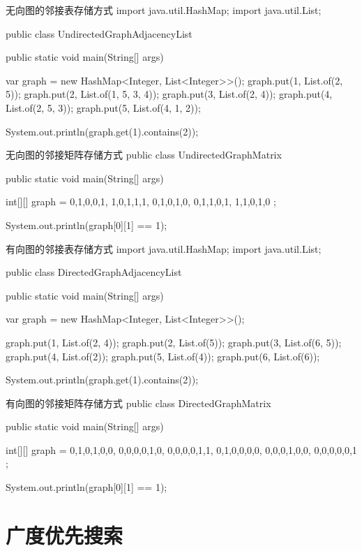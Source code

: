 \documentclass[oneside,10pt,fontset=none]{ctexbook}
\numberwithin{definition}{chapter}
\numberwithin{theorem}{chapter}
\numberwithin{lemma}{chapter}
\begin{document}
\begin{myjava}{}{无向图的邻接表存储方式}{}
import java.util.HashMap;
import java.util.List;

public class UndirectedGraphAdjacencyList {
    public static void main(String[] args) {
        var graph = new HashMap<Integer, List<Integer>>();
        graph.put(1, List.of(2, 5));
        graph.put(2, List.of(1, 5, 3, 4));
        graph.put(3, List.of(2, 4));
        graph.put(4, List.of(2, 5, 3));
        graph.put(5, List.of(4, 1, 2));

        System.out.println(graph.get(1).contains(2));
    }
}
\end{myjava}

\begin{myjava}{}{无向图的邻接矩阵存储方式}{}
public class UndirectedGraphMatrix {
    public static void main(String[] args) {
        int[][] graph = {
                {0,1,0,0,1},
                {1,0,1,1,1},
                {0,1,0,1,0},
                {0,1,1,0,1},
                {1,1,0,1,0}
        };

        System.out.println(graph[0][1] == 1);
    }
}
\end{myjava}

\begin{myjava}{}{有向图的邻接表存储方式}{}
import java.util.HashMap;
import java.util.List;

public class DirectedGraphAdjacencyList {
    public static void main(String[] args) {
        var graph = new HashMap<Integer, List<Integer>>();

        graph.put(1, List.of(2, 4));
        graph.put(2, List.of(5));
        graph.put(3, List.of(6, 5));
        graph.put(4, List.of(2));
        graph.put(5, List.of(4));
        graph.put(6, List.of(6));

        System.out.println(graph.get(1).contains(2));
    }
}
\end{myjava}

\begin{myjava}{}{有向图的邻接矩阵存储方式}{}
public class DirectedGraphMatrix {
    public static void main(String[] args) {
        int[][] graph = {
                {0,1,0,1,0,0},
                {0,0,0,0,1,0},
                {0,0,0,0,1,1},
                {0,1,0,0,0,0},
                {0,0,0,1,0,0},
                {0,0,0,0,0,1}
        };

        System.out.println(graph[0][1] == 1);
    }
}
\end{myjava}

\chapter{广度优先搜索}
\end{document}

